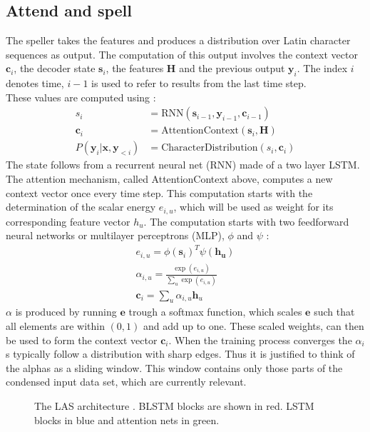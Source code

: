 \subsection{Attend and spell}
The speller takes the features and produces a distribution over Latin character sequences as output. The computation of this output involves the context vector $\mathbf{c}_i$, the decoder state $\mathbf{s}_i$, the features $\mathbf{H}$ and the previous output $\mathbf{y}_i$. The index $i$ denotes time, $i-1$ is used to refer to results from the last time step. \\
These values are computed using \cite[page 4]{Chan2015}:
\begin{align}
 s_i &= \text{RNN}(\mathbf{s}_{i-1}, \mathbf{y}_{i-1}, \mathbf{c}_{i-1}) \\
 \mathbf{c}_i &= \text{AttentionContext}(\mathbf{s}_i,\mathbf{H}) \\
  P(\mathbf{y}_i|\mathbf{x}, \mathbf{y}_{<i}) &= \text{CharacterDistribution}(s_i,\textbf{c}_i)
\end{align}
The state follows from a recurrent neural net (RNN) made of a two layer LSTM.
The attention mechanism, called AttentionContext above, computes a new context vector once every time step.
This computation starts with the determination of the scalar energy $e_{i,u}$, which will be used as weight for its corresponding feature vector  $h_u$. The computation starts with two feedforward neural networks or multilayer perceptrons (MLP), $\phi$ and $\psi$ \cite[page 5]{Chan2015}:
\begin{align}
e_{i,u} = \phi(\mathbf{s}_i)^T \psi(\mathbf{h_u}) \\
\alpha_{i,u} = \frac{ \exp(e_{i,u})}{ \sum\limits_{u} \exp(e_{i,u})} \\
\mathbf{c}_i = \sum\limits_{u} \alpha_{i,u} \mathbf{h}_u
\end{align}
$\alpha$ is produced by running $\mathbf{e}$ trough a softmax function, which scales $\mathbf{e}$ such that all elements are within $(0,1)$ and add up to one. These scaled weights, can then be used to form the context vector $\mathbf{c}_i$. When the training process converges the $\alpha_i$s typically follow a distribution with sharp edges\cite[page 5]{Chan2015}. Thus it is justified to think of the alphas as a sliding window. This window contains only those parts of the condensed input data set, which are currently relevant.

\begin{figure}

\caption{The LAS architecture \cite[page 3]{Chan2015}. BLSTM blocks are shown in red. LSTM blocks in blue and attention nets in green.}
\label{fig:las}
\end{figure}

